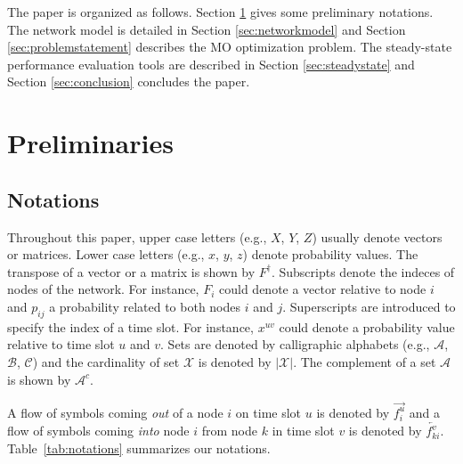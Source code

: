 \documentclass[a4paper]{article}
\newcommand{\X}{\mathcal{X}}
\begin{document}
The paper is organized as follows. Section \ref{sec:preliminaries} gives some preliminary notations. The network model is detailed in Section \ref{sec:networkmodel} and Section \ref{sec:problemstatement} describes the MO optimization problem. The steady-state performance evaluation tools are described in Section \ref{sec:steadystate} and Section \ref{sec:conclusion} concludes the paper. 

\section{Preliminaries}\label{sec:preliminaries}

\subsection{Notations}
Throughout this paper, upper case letters (e.g., $X$, $Y$, $Z$) usually denote vectors or matrices. 
Lower case letters (e.g., $x$, $y$, $z$) denote probability values. 
The transpose of a vector or a matrix is shown by $F^{\dagger}$. 
Subscripts denote the indeces of nodes of the network. For instance, $F_i$ could denote a vector relative to node $i$ and $p_{ij}$ a probability related to both nodes $i$ and $j$.
Superscripts are introduced to specify the index of a time slot. For instance, $x^{uv}$ could denote a probability value relative to time slot $u$ and $v$. 
Sets are denoted by calligraphic alphabets (e.g., $\mathcal{A}$, $\mathcal{B}$, $\mathcal{C}$) and the cardinality of set $\X$ is denoted by $|\X|$. The complement of a set $\mathcal{A}$ is shown by $\mathcal{A}^{c}$.

A flow of symbols coming \emph{out} of a node $i$ on time slot $u$ is denoted by $\overrightarrow{f_i^u}$ and a flow of symbols coming \emph{into} node $i$ from node $k$ in time slot $v$ is denoted by  $\overleftarrow{f_{ki}^v}$.  
Table~\ref{tab:notations} summarizes our notations.
\end{document}
